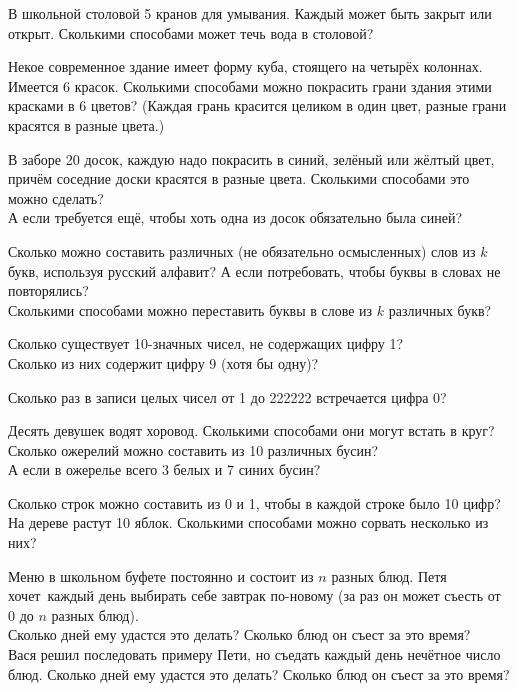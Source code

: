 \documentclass[a4paper,12pt]{article}
\begin{document}

В школьной столовой 5 кранов для умывания. Каждый может быть закрыт или
открыт. Сколькими способами может течь вода в столовой?

 Некое современное здание имеет форму куба, стоящего на
четырёх колоннах. Имеется 6 красок. Сколькими способами можно
покрасить грани здания этими красками в 6 цветов? (Каждая грань
красится целиком в один цвет, разные грани красятся в разные цвета.)

 В заборе 20 досок, каждую надо покрасить в синий,
зелёный или жёлтый цвет, причём соседние доски красятся в разные
цвета. Сколькими способами это можно сделать? \\
 А если
требуется ещё, чтобы хоть одна из досок обязательно была синей?

Сколько можно составить различных
(не обязательно осмысленных) слов из $k$ букв,
используя русский алфавит?
А если потребовать, чтобы буквы в словах не повторялись?\\
Сколькими способами можно переставить буквы в слове из $k$ различных букв?


 Сколько существует 10-значных чисел, не содержащих
цифру 1?\\
 Сколько из них содержит цифру 9 (хотя бы одну)?

Сколько раз в записи целых чисел от 1 до 222222 встречается цифра 0?

Десять девушек водят хоровод. Сколькими способами они могут встать
в круг?\\
Сколько ожерелий можно составить из 10 различных бусин?\\
 А если в ожерелье всего 3 белых и 7 синих бусин?

Сколько строк можно составить из 0 и 1, чтобы в каждой строке было 10 цифр?
На дереве растут 10 яблок. Сколькими способами можно сорвать
несколько из них?

 Меню в школьном буфете постоянно и состоит из $n$ разных
блюд. Петя хочет~каждый день выбирать себе завтрак по-новому
(за раз он может съесть от 0 до $n$ разных блюд).\\
 Сколько дней ему удастся это делать?
 Сколько блюд он съест за это время? \\
 Вася решил последовать
примеру Пети, но съедать каждый день нечётное число блюд. Сколько
дней ему удастся это делать?
  Сколько блюд он съест за это время?
\end{document}
